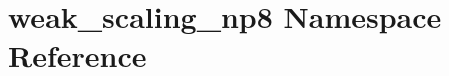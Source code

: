 \hypertarget{namespaceweak__scaling__np8}{}\section{weak\+\_\+scaling\+\_\+np8 Namespace Reference}
\label{namespaceweak__scaling__np8}
